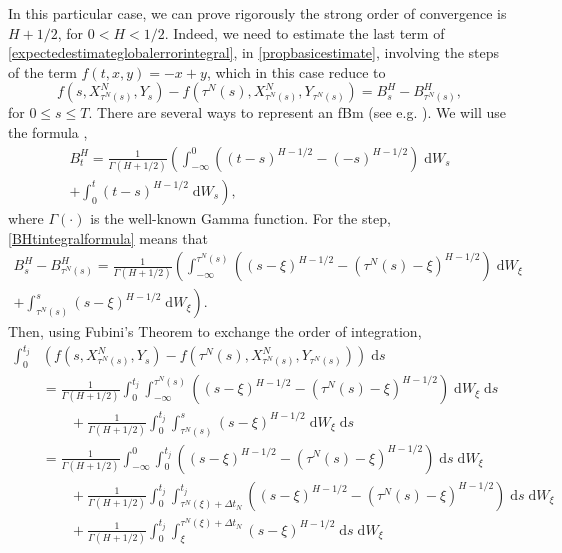 \documentclass[reqno,12pt]{amsart}
\theoremstyle{plain}%
\theoremstyle{definition}
\begin{document}
In this particular case, we can prove rigorously the strong order of convergence is $H+1/2$, for $0 < H < 1/2$. Indeed, we need to estimate the last term of \eqref{expectedestimateglobalerrorintegral}, in \cref{propbasicestimate}, involving the steps of the term $f(t, x, y) = -x + y$, which in this case reduce to
\begin{equation}
    \label{stepfBm}
    f(s, X_{\tau^N(s)}^N, Y_s) - f(\tau^N(s), X_{\tau^N(s)}^N, Y_{\tau^N(s)}) = B^H_s - B^H_{\tau^N(s)},
\end{equation}
for $0 \leq s \leq T$. There are several ways to represent an fBm (see e.g. \cite{BHOB2008, Mishura2008}). We will use the formula \cite[eq. (2.1)]{MandelbrotVanNess1968}, \cite[eq. (1.1)]{BHOB2008}
\begin{multline}
    \label{BHtintegralformula}
    B^H_t = \frac{1}{\Gamma(H + 1/2)}\left(\int_{-\infty}^0 \left( (t-s)^{H-1/2} - (-s)^{H-1/2}\right) \;\mathrm{d}W_s \right. \\
    \left. + \int_0^t (t - s)^{H-1/2} \;\mathrm{d}W_s\right),
\end{multline}
where $\Gamma(\cdot)$ is the well-known Gamma function. For the step, \eqref{BHtintegralformula} means that
\begin{multline}
    \label{BHtintegralformulastep}
    B^H_s - B^H_{\tau^N(s)} = \frac{1}{\Gamma(H + 1/2)}\left(\int_{-\infty}^{\tau^N(s)} \left( (s-\xi)^{H-1/2} - (\tau^N(s)-\xi)^{H-1/2}\right) \;\mathrm{d}W_\xi \right. \\
    \left. + \int_{\tau^N(s)}^s (s - \xi)^{H-1/2} \;\mathrm{d}W_\xi\right).
\end{multline}
Then, using Fubini's Theorem to exchange the order of integration,
\begin{equation}
    \label{integralofstepfBm}
    \begin{aligned}
        \int_0^{t_j} & \left( f(s, X_{\tau^N(s)}^N, Y_s) - f(\tau^N(s), X_{\tau^N(s)}^N, Y_{\tau^N(s)}) \right)\;\mathrm{d}s \\
        & = \frac{1}{\Gamma(H + 1/2)}\int_0^{t_j} \int_{-\infty}^{\tau^N(s)} \left( (s-\xi)^{H-1/2} - (\tau^N(s)-\xi)^{H-1/2}\right) \;\mathrm{d}W_\xi \;\mathrm{d}s \\
        & \qquad + \frac{1}{\Gamma(H + 1/2)}\int_0^{t_j} \int_{\tau^N(s)}^s (s - \xi)^{H-1/2} \;\mathrm{d}W_\xi \;\mathrm{d}s \\
        & = \frac{1}{\Gamma(H + 1/2)}\int_{-\infty}^{0} \int_{0}^{t_j} \left( (s-\xi)^{H-1/2} - (\tau^N(s)-\xi)^{H-1/2}\right) \;\mathrm{d}s \;\mathrm{d}W_\xi \\
        & \qquad + \frac{1}{\Gamma(H + 1/2)}\int_{0}^{t_j} \int_{\tau^N(\xi)+\Delta t_N}^{t_j} \left( (s-\xi)^{H-1/2} - (\tau^N(s)-\xi)^{H-1/2}\right)  \;\mathrm{d}s \;\mathrm{d}W_\xi\\
        & \qquad + \frac{1}{\Gamma(H + 1/2)}\int_0^{t_j} \int_\xi^{\tau^N(\xi) + \Delta t_N} (s - \xi)^{H-1/2} \;\mathrm{d}s \;\mathrm{d}W_\xi \\
    \end{aligned}
\end{equation}
\end{document}

